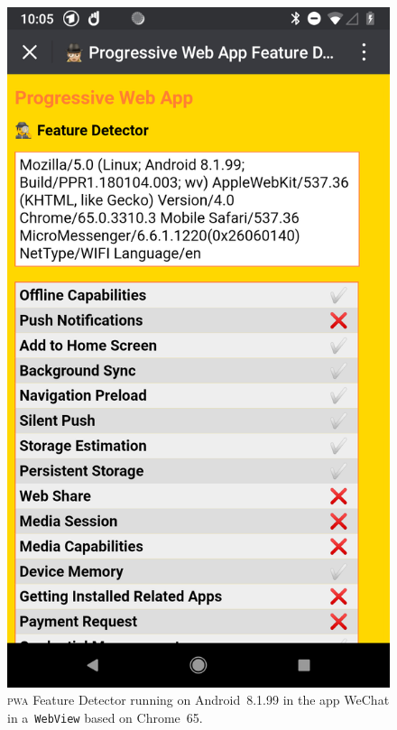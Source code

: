 \documentclass[sigconf]{acmart}
\begin{document}
\begin{figure}[t]
  \centering
  \includegraphics[width=.75\columnwidth,frame]{pwa-feature-detector-wechat-android-chrome65}
  \caption[\textsc{pwa} Feature Detector running in WeChat.]{
    \textsc{pwa} Feature Detector running on Android~8.1.99 in the app WeChat
    in a~\texttt{WebView} based on Chrome~65.}
  \label{fig:wechat-android-chrome65}
\end{figure}
\end{document}
